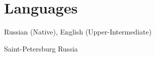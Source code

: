 \documentclass[11pt,a4paper,sans]{moderncv}        %
\begin{document}
	
	\section{Languages}
		Russian (Native), English (Upper-Intermediate)
	
	\vspace*{\fill}
	\name{}{}
	\title{}
	\address{Novoizmailovsky prospect, 16k8}{Saint-Petersburg}{ Russia }
	\makecvtitle
\end{document}
